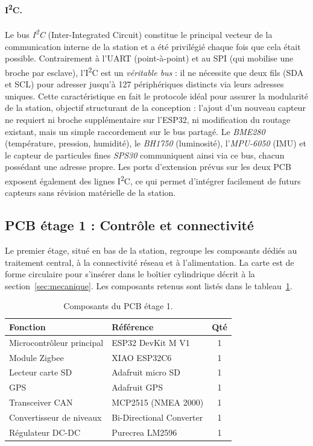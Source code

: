 \paragraph{I\textsuperscript{2}C.}
Le bus \textit{I\textsuperscript{2}C} (Inter-Integrated Circuit) constitue le
principal vecteur de la communication interne de la station et a été privilégié
chaque fois que cela était possible. Contrairement à l'UART (point-à-point) et
au SPI (qui mobilise une broche par esclave), l'I\textsuperscript{2}C est un
\textit{véritable bus} : il ne nécessite que deux fils (SDA et SCL) pour
adresser jusqu'à 127 périphériques distincts via leurs adresses uniques. Cette
caractéristique en fait le protocole idéal pour assurer la modularité de la
station, objectif structurant de la conception : l'ajout d'un nouveau capteur
ne requiert ni broche supplémentaire sur l'ESP32, ni modification du routage
existant, mais un simple raccordement sur le bus partagé. Le \textit{BME280}
(température, pression, humidité), le \textit{BH1750} (luminosité), l'\textit{MPU-6050}
(IMU) et le capteur de particules fines \textit{SPS30} communiquent ainsi via
ce bus, chacun possédant une adresse propre. Les ports d'extension prévus sur
les deux PCB exposent également des lignes I\textsuperscript{2}C, ce qui permet
d'intégrer facilement de futurs capteurs sans révision matérielle de la station.


\subsection{PCB étage 1 : Contrôle et connectivité}\label{subsec:pcb1}

Le premier étage, situé en bas de la station, regroupe les composants dédiés
au traitement central, à la connectivité réseau et à l'alimentation. La carte
est de forme circulaire pour s'insérer dans le boîtier cylindrique décrit à
la section~\ref{sec:mecanique}. Les composants retenus sont listés dans le
tableau~\ref{tab:pcb1}.

\begin{table}[H]
  \centering
  \caption{Composants du PCB étage 1.}
  \label{tab:pcb1}
  \begin{tabular}{llc}
    \toprule
    \textbf{Fonction} & \textbf{Référence} & \textbf{Qté} \\
    \midrule
    Microcontrôleur principal & ESP32 DevKit M V1         & 1 \\
    Module Zigbee             & XIAO ESP32C6              & 1 \\
    Lecteur carte SD          & Adafruit micro SD         & 1 \\
    GPS                       & Adafruit GPS              & 1 \\
    Transceiver CAN           & MCP2515 (NMEA 2000)       & 1 \\
    Convertisseur de niveaux  & Bi-Directional Converter  & 1 \\
    Régulateur DC-DC          & Purecrea LM2596           & 1 \\
    \bottomrule
  \end{tabular}
\end{table}

